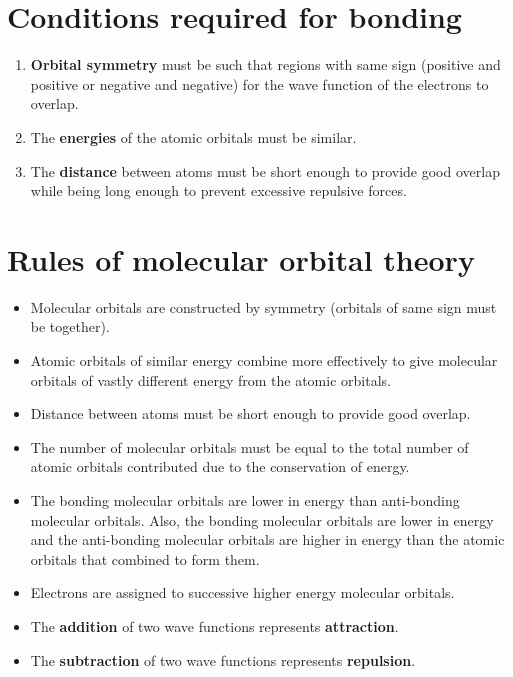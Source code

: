 \documentclass[11pt]{article}
\begin{document}
\section{Conditions required for bonding}
\label{sec:orgaa81816}
\begin{enumerate}
\item \textbf{Orbital symmetry} must be such that regions with same sign (positive and positive or negative and negative) for the wave function of the electrons to overlap.
\item The \textbf{energies} of the atomic orbitals must be similar.
\item The \textbf{distance} between atoms must be short enough to provide good overlap while being long enough to prevent excessive repulsive forces.
\end{enumerate}

\newpage

\section{Rules of molecular orbital theory}
\label{sec:org6e3364c}
\begin{itemize}
\item Molecular orbitals are constructed by symmetry (orbitals of same sign must be together).
\item Atomic orbitals of similar energy combine more effectively to give molecular orbitals of vastly different energy from the atomic orbitals.
\item Distance between atoms must be short enough to provide good overlap.
\item The number of molecular orbitals must be equal to the total number of atomic orbitals contributed due to the conservation of energy.
\item The bonding molecular orbitals are lower in energy than anti-bonding molecular orbitals. Also, the bonding molecular orbitals are lower in energy and the anti-bonding molecular orbitals are higher in energy than the atomic orbitals that combined to form them.
\item Electrons are assigned to successive higher energy molecular orbitals.
\item The \textbf{addition} of two wave functions represents \textbf{attraction}.
\item The \textbf{subtraction} of two wave functions represents \textbf{repulsion}.
\end{itemize}
\end{document}
